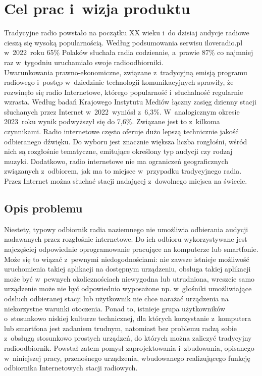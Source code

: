 \documentclass[polish]{aghengthesis}
\author{Norbert Morawski}
\date{\the\year}
\begin{document}
\lstset{inputencoding=utf8, basicstyle=\ttfamily}

\maketitle

\tableofcontents

\cleardoublepage
\chapter{Cel prac i~wizja produktu}
	Tradycyjne radio powstało na początku XX wieku i~do dzisiaj audycje radiowe cieszą się wysoką popularnością. Według podsumowania serwisu iloveradio.pl\textsuperscript{\cite{iloveradio_stats}} w~2022~roku 65\% Polaków słuchała radia codziennie, a~prawie 87\% co najmniej raz w~tygodniu uruchamiało swoje radioodbiorniki. 
	$ $\\
	
	Uwarunkowania prawno-ekonomiczne, związane z~tradycyjną emisją programu radiowego i~postęp w~dziedzinie technologii komunikacyjnych sprawiły, że rozwinęło się radio Internetowe, którego popularność i~słuchalność regularnie wzrasta. Według badań Krajowego Instytutu Mediów łączny zasięg dzienny stacji słuchanych przez Internet w~2022~wyniósł z~6,3\%\textsuperscript{\cite{kim_2022}}. W~analogicznym okresie 2023~roku wynik podwyższył się do 7,6\%\textsuperscript{\cite{kim_2023}}.
	Związane jest to z~kilkoma czynnikami. Radio internetowe często oferuje dużo lepszą technicznie jakość odbieranego dźwięku. Do wyboru jest znacznie większa liczba rozgłośni, wśród nich są rozgłośnie tematyczne, emitujące określony typ audycji czy rodzaj muzyki. Dodatkowo, radio internetowe nie ma ograniczeń geograficznych związanych z~odbiorem, jak ma to miejsce w~przypadku tradycyjnego radia. Przez Internet można słuchać stacji nadającej z~dowolnego miejsca na świecie.
	
	\section{Opis problemu}
			Niestety, typowy odbiornik radia naziemnego nie umożliwia odbierania audycji nadawanych przez rozgłośnie internetowe.
			Do ich odbioru wykorzystywane jest najczęściej odpowiednie oprogramowanie pracujące na komputerze lub smartfonie.
			Może się to wiązać z~pewnymi niedogodnościami: nie zawsze istnieje możliwość uruchomienia takiej aplikacji na dostępnym urządzeniu, obsługa takiej aplikacji może być w~pewnych okolicznościach niewygodna lub utrudniona, wreszcie samo urządzenie może nie być odpowiednio wyposażone np. w~głośniki umożliwiające odsłuch odbieranej stacji lub użytkownik nie chce narażać urządzenia na niekorzystne warunki otoczenia. Ponad to, istnieje grupa użytkowników o~stosunkowo niskiej kulturze technicznej, dla których korzystanie z~komputera lub smartfona jest zadaniem trudnym, natomiast bez problemu radzą sobie z~obsługą stosunkowo prostych urządzeń, do których można zaliczyć tradycyjny radioodbiornik. Powstał zatem pomysł zaprojektowania i~zbudowania, opisanego w~niniejszej pracy, przenośnego urządzenia, wbudowanego realizującego funkcję odbiornika Internetowych stacji radiowych.
		
\end{document}

